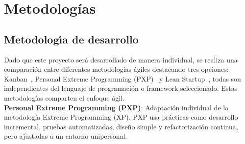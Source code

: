 ﻿\documentclass{iccmemoria}
\begin{document}
\section{Metodologías}
\subsection{Metodologı́a de desarrollo}
Dado que este proyecto será desarrollado de manera individual, se realiza una comparación entre diferentes metodologías ágiles destacando tres opciones: Kanban~\cite{kanban}, Personal Extreme Programming (PXP)~\cite{PXP} y Lean Startup~\cite{lean}, todas son independientes del lenguaje de programación o framework seleccionado. Estas metodologías comparten el enfoque ágil.\\

\noindent \textbf{Personal Extreme Programming (PXP)}: Adaptación individual de la metodología Extreme Programming (XP). PXP usa prácticas como desarrollo incremental, pruebas automatizadas, diseño simple y refactorización continua, pero ajustadas a un entorno unipersonal.\\
\end{document}
